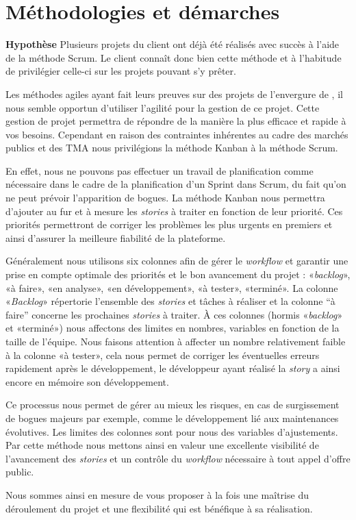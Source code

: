 \section{Méthodologies et démarches}
\begin{exemple}
\textbf{Hypothèse} Plusieurs projets du client ont déjà été réalisés avec succès à l’aide de la méthode Scrum. Le client connaît donc bien cette méthode et à l’habitude de privilégier celle-ci sur les projets pouvant s’y prêter.
\end{exemple}

Les méthodes agiles ayant fait leurs preuves sur des projets de l’envergure de \correlyce{}, il nous semble opportun d’utiliser l’agilité pour la gestion de ce projet. Cette gestion de projet permettra de répondre de la manière la plus efficace et rapide à vos besoins. Cependant en raison des contraintes inhérentes au cadre des marchés publics et des TMA nous privilégions la méthode Kanban à la méthode Scrum. 

En effet, nous ne pouvons pas effectuer un travail de planification comme nécessaire dans le cadre de la planification d’un Sprint dans Scrum, du fait qu’on ne peut prévoir l’apparition de bogues. La méthode Kanban nous permettra d’ajouter au fur et à mesure les \textit{stories} à traiter en fonction de leur priorité. Ces priorités permettront de corriger les problèmes les plus urgents en premiers et ainsi d’assurer la meilleure fiabilité de la plateforme.

Généralement nous utilisons six colonnes afin de gérer le \textit{workflow} et garantir une prise en compte optimale des priorités et le bon avancement du projet : «\textit{backlog}», «à faire», «en analyse», «en développement», «à tester», «terminé». 
La colonne «\textit{Backlog}» répertorie l’ensemble des \textit{stories} et tâches à réaliser et la colonne “à faire” concerne les prochaines \textit{stories} à traiter. 
À ces colonnes (hormis «\textit{backlog}» et «terminé») nous affectons des limites en nombres, variables en fonction de la taille de l’équipe. Nous faisons attention à affecter un nombre relativement faible à la colonne «à tester», cela nous permet de corriger les éventuelles erreurs rapidement après le développement, le développeur ayant réalisé la \textit{story} a ainsi encore en mémoire son développement. 

Ce processus nous permet de gérer au mieux les risques, en cas de surgissement de bogues majeurs par exemple, comme le développement lié aux maintenances évolutives. Les limites des colonnes sont pour nous des variables d’ajustements. Par cette méthode nous mettons ainsi en valeur une excellente visibilité de l’avancement des \textit{stories} et un contrôle du \textit{workflow} nécessaire à tout appel d’offre public. 

Nous sommes ainsi en mesure de vous proposer à la fois une maîtrise du déroulement du projet et une flexibilité qui est bénéfique à sa réalisation. 

